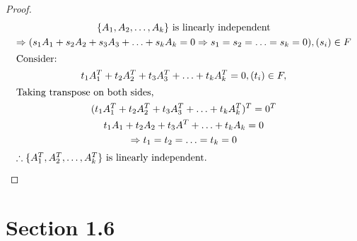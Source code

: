 \documentclass[12pt]{article}
\newenvironment{problem}[2][Problem]{\begin{trivlist}
\item[\hskip \labelsep {\bfseries #1}\hskip \labelsep {\bfseries #2.}]}{\end{trivlist}}
\begin{document}
\begin{problem}{19}
\end{problem}
\begin{proof}
\begin{gather*}
	\{ A_1, A_2, \ldots, A_k \} \text{ is linearly independent}\\
	\Rightarrow ( s_1 A_1 + s_2 A_2 + s_3 A_3 + \ldots + s_k A_k = 0 
	\Rightarrow s_1 = s_2 = \ldots = s_k = 0 ), (s_i)\in F \\
	\shortintertext{Consider:}
	t_1 A_1^T + t_2 A_2^T + t_3 A_3^T + \ldots + t_k A_k^T = 0, (t_i)\in F, \\
	\intertext{Taking transpose on both sides,}
	(t_1 A_1^T + t_2 A_2^T + t_3 A_3^T + \ldots + t_k A_k^T)^T = 0^T\\
	t_1 A_1 + t_2 A_2 + t_3 A^T + \ldots + t_k A_k = 0\\
	\Rightarrow t_1 = t_2 = \ldots = t_k = 0 \\
	\intertext{$\therefore \{ A_1^T, A_2^T, \ldots, A_k^T \}$ is linearly independent.}
\end{gather*}
\end{proof}
\filbreak

\section*{Section 1.6}
\end{document}
